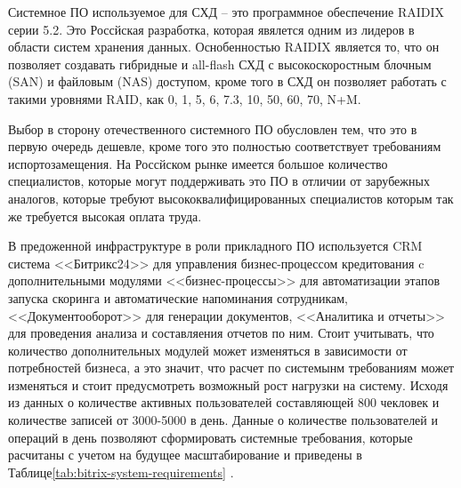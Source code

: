 \documentclass[14pt, a4paper]{extarticle}
\begin{document}
Системное ПО используемое для СХД -- это программное обеспечение RAIDIX серии 5.2.
Это Россйская разработка, которая явялется одним из лидеров в области систем хранения
данных. Оснобенностью RAIDIX является то, что он позволяет создавать гибридные и
all-flash СХД с высокоскоростным блочным (SAN) и файловым (NAS) доступом, кроме того
в СХД он позволяет работать с такими уровнями RAID, как 0, 1, 5, 6, 7.3, 10, 50, 60, 70, N+M.

Выбор в сторону отечественного системного ПО обусловлен тем, что это в первую очередь дешевле,
кроме того это полностью соответствует требованиям испортозамещения. На Россйском
рынке имеется большое количество специалистов, которые могут поддерживать это ПО
в отличии от зарубежных аналогов, которые требуют высококвалифицированных специалистов
которым так же требуется высокая оплата труда.

В предоженной инфраструктуре в роли прикладного ПО используется CRM система <<Битрикс24>>
\cite{bitrix24} для управления бизнес-процессом кредитования c дополнительными модулями
<<бизнес-процессы>> для автоматизации этапов запуска скоринга и автоматические напоминания
сотрудникам, <<Документооборот>> для генерации документов, <<Аналитика и отчеты>>
для проведения анализа и составляения отчетов по ним. Стоит учитывать, что количество
дополнительных модулей может изменяться в зависимости от потребностей бизнеса, а
это значит, что расчет по системынм требованиям может изменяться и стоит предусмотреть возможный
рост нагрузки на систему. Исходя из данных о количестве активных пользователей составляющей
800 чекловек и количестве записей от 3000-5000 в день. Данные о количестве пользователей
и операций в день позволяют сформировать системные требования, которые расчитаны с учетом
на будущее масштабирование и приведены в Таблице\;\ref{tab:bitrix-system-requirements} \cite{bitrix24-system-requirements}.
\end{document}
